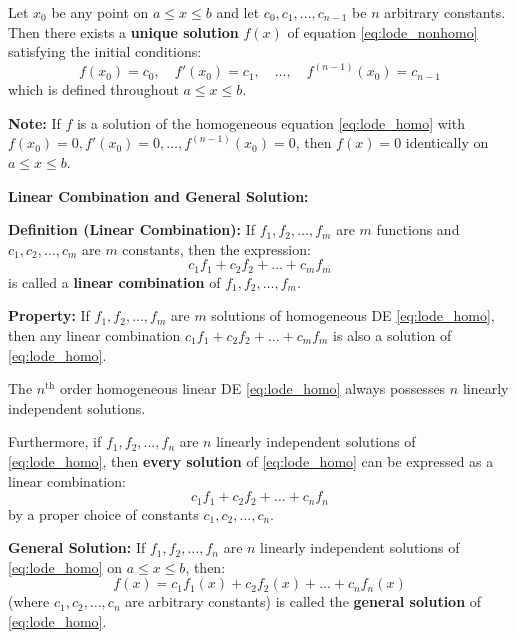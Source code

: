 \documentclass[11pt,a4paper]{article}
\newcommand{\Heading}[1]{\vspace{0.3cm}\noindent\textbf{\textcolor{AcademicGreen}{\large #1}}\par\vspace{0.15cm}}
\begin{document}
\vspace{0.3cm}
\begin{tcolorbox}[theorembox, title=Existence and Uniqueness Theorem]
    Let $x_0$ be any point on $a \le x \le b$ and let $c_0, c_1, \dots, c_{n-1}$ be $n$ arbitrary constants.
    Then there exists a \textbf{unique solution} $f(x)$ of equation \eqref{eq:lode_nonhomo} satisfying the initial conditions:
    \[
    f(x_0) = c_0, \quad f'(x_0) = c_1, \quad \dots, \quad f^{(n-1)}(x_0) = c_{n-1}
    \]
    which is defined throughout $a \le x \le b$.
\end{tcolorbox}

\vspace{0.2cm}
\noindent\textbf{Note:} If $f$ is a solution of the homogeneous equation \eqref{eq:lode_homo} with $f(x_0) = 0, f'(x_0) = 0, \dots, f^{(n-1)}(x_0) = 0$, then $f(x) = 0$ identically on $a \le x \le b$.

\Heading{Linear Combination and General Solution:}

\noindent\textbf{Definition (Linear Combination):} If $f_1, f_2, \dots, f_m$ are $m$ functions and $c_1, c_2, \dots, c_m$ are $m$ constants, then the expression:
\[
c_1 f_1 + c_2 f_2 + \dots + c_m f_m
\]
is called a \textbf{linear combination} of $f_1, f_2, \dots, f_m$.

\vspace{0.2cm}
\noindent\textbf{Property:} If $f_1, f_2, \dots, f_m$ are $m$ solutions of homogeneous DE \eqref{eq:lode_homo}, then any linear combination $c_1 f_1 + c_2 f_2 + \dots + c_m f_m$ is also a solution of \eqref{eq:lode_homo}.

\vspace{0.3cm}
\begin{tcolorbox}[theorembox, title=Fundamental Theorem of Homogeneous LODEs]
    The $n^{\text{th}}$ order homogeneous linear DE \eqref{eq:lode_homo} always possesses $n$ linearly independent solutions.
    
    \vspace{0.15cm}
    \noindent Furthermore, if $f_1, f_2, \dots, f_n$ are $n$ linearly independent solutions of \eqref{eq:lode_homo}, then \textbf{every solution} of \eqref{eq:lode_homo} can be expressed as a linear combination:
    \[
    c_1 f_1 + c_2 f_2 + \dots + c_n f_n
    \]
    by a proper choice of constants $c_1, c_2, \dots, c_n$.
\end{tcolorbox}

\vspace{0.3cm}
\noindent\textbf{General Solution:} If $f_1, f_2, \dots, f_n$ are $n$ linearly independent solutions of \eqref{eq:lode_homo} on $a \le x \le b$, then:
\[
f(x) = c_1 f_1(x) + c_2 f_2(x) + \dots + c_n f_n(x)
\]
(where $c_1, c_2, \dots, c_n$ are arbitrary constants) is called the \textbf{general solution} of \eqref{eq:lode_homo}.
\end{document}
